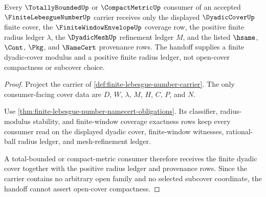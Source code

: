 \begin{theorem}
\label{thm:finite-lebesgue-number-dyadic-cover-handoff}
Every $\TotallyBoundedUp$ or $\CompactMetricUp$ consumer of an accepted $\FiniteLebesgueNumberUp$ carrier receives only the displayed $\DyadicCoverUp$ finite cover, the $\FiniteWindowEnvelopeUp$ coverage row, the positive finite radius ledger $\lambda$, the $\DyadicMeshUp$ refinement ledger $M$, and the listed $\hsame$, $\Cont$, $\Pkg$, and $\NameCert$ provenance rows. The handoff supplies a finite dyadic-cover modulus and a positive finite radius ledger, not open-cover compactness or subcover choice.
\end{theorem}
\begin{proof}
Project the carrier of \autoref{def:finite-lebesgue-number-carrier}. The only consumer-facing cover data are $D$, $W$, $\lambda$, $M$, $H$, $C$, $P$, and $N$.

Use \autoref{thm:finite-lebesgue-number-namecert-obligations}. Its classifier, radius-modulus stability, and finite-window coverage exactness rows keep every consumer read on the displayed dyadic cover, finite-window witnesses, rational-ball radius ledger, and mesh-refinement ledger.

A total-bounded or compact-metric consumer therefore receives the finite dyadic cover together with the positive radius ledger and provenance rows. Since the carrier contains no arbitrary open family and no selected subcover coordinate, the handoff cannot assert open-cover compactness.
\end{proof}

